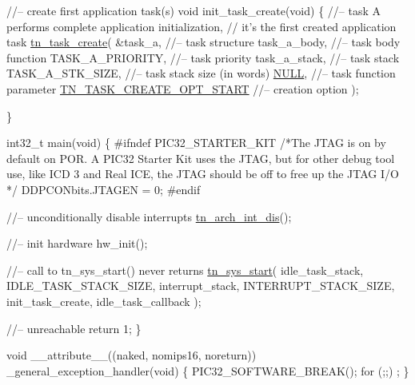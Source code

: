 \begin{DoxyCodeInclude}
\textcolor{comment}{//-- create first application task(s)}
\textcolor{keywordtype}{void} init\_task\_create(\textcolor{keywordtype}{void})
\{
   \textcolor{comment}{//-- task A performs complete application initialization,}
   \textcolor{comment}{//   it's the first created application task}
   \hyperlink{tn__tasks_8h_a548d5adda09d1b4e393b5df0e9e1a7a5}{tn\_task\_create}(
         &task\_a,                   \textcolor{comment}{//-- task structure}
         task\_a\_body,               \textcolor{comment}{//-- task body function}
         TASK\_A\_PRIORITY,           \textcolor{comment}{//-- task priority}
         task\_a\_stack,              \textcolor{comment}{//-- task stack}
         TASK\_A\_STK\_SIZE,           \textcolor{comment}{//-- task stack size (in words)}
         \hyperlink{tn__common_8h_a070d2ce7b6bb7e5c05602aa8c308d0c4}{NULL},                      \textcolor{comment}{//-- task function parameter}
         \hyperlink{tn__tasks_8h_a8fa2ef577d6bd159b3fae559839f98d5a0c9352496e4465eb7e1b29dab7544acc}{TN\_TASK\_CREATE\_OPT\_START}   \textcolor{comment}{//-- creation option}
         );

\}

int32\_t main(\textcolor{keywordtype}{void})
\{
\textcolor{preprocessor}{#ifndef PIC32\_STARTER\_KIT}
   \textcolor{comment}{/*The JTAG is on by default on POR.  A PIC32 Starter Kit uses the JTAG, but}
\textcolor{comment}{     for other debug tool use, like ICD 3 and Real ICE, the JTAG should be off}
\textcolor{comment}{     to free up the JTAG I/O */}
   DDPCONbits.JTAGEN = 0;
\textcolor{preprocessor}{#endif}

   \textcolor{comment}{//-- unconditionally disable interrupts}
   \hyperlink{tn__arch_8h_a2b3f2294ac42a599662c573394b14c75}{tn\_arch\_int\_dis}();

   \textcolor{comment}{//-- init hardware}
   hw\_init();

   \textcolor{comment}{//-- call to tn\_sys\_start() never returns}
   \hyperlink{tn__sys_8h_a62ab25d9d8ca01c02d368968f19e49bf}{tn\_sys\_start}(
         idle\_task\_stack,
         IDLE\_TASK\_STACK\_SIZE,
         interrupt\_stack,
         INTERRUPT\_STACK\_SIZE,
         init\_task\_create,
         idle\_task\_callback
         );

   \textcolor{comment}{//-- unreachable}
   \textcolor{keywordflow}{return} 1;
\}

\textcolor{keywordtype}{void} \_\_attribute\_\_((naked, nomips16, noreturn)) \_general\_exception\_handler(\textcolor{keywordtype}{void})
\{
   PIC32\_SOFTWARE\_BREAK();
   \textcolor{keywordflow}{for} (;;) ;
\}

\end{DoxyCodeInclude}
